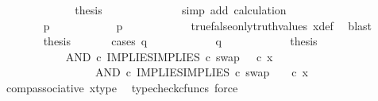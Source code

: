 \begin{isabellebody}
\ \ \ \ \ \ \ \ \ \ \isamarkupfalse%
\ \isamarkupfalse%
\ {\isacharquery}{\kern0pt}thesis\isanewline
\ \ \ \ \ \ \ \ \ \ \ \ \isamarkupfalse%
\ {\isacharparenleft}{\kern0pt}simp\ add{\isacharcolon}{\kern0pt}\ calculation{\isacharparenright}{\kern0pt}\isanewline
\ \ \ \ \ \ \ \ \isamarkupfalse%
\isanewline
\ \ \ \ \ \ \isamarkupfalse%
\isanewline
\ \ \ \ \isamarkupfalse%
\isanewline
\ \ \ \ \ \ \isamarkupfalse%
\ {\isachardoublequoteopen}p\ {\isasymnoteq}\ {\isasymt}{\isachardoublequoteclose}\isanewline
\ \ \ \ \ \ \isamarkupfalse%
\ \isamarkupfalse%
\ {\isachardoublequoteopen}p\ {\isacharequal}{\kern0pt}\ {\isasymf}{\isachardoublequoteclose}\isanewline
\ \ \ \ \ \ \ \ \isamarkupfalse%
\ true{\isacharunderscore}{\kern0pt}false{\isacharunderscore}{\kern0pt}only{\isacharunderscore}{\kern0pt}truth{\isacharunderscore}{\kern0pt}values\ x{\isacharunderscore}{\kern0pt}def\ \isamarkupfalse%
\ blast\isanewline
\ \ \ \ \ \ \isamarkupfalse%
\ {\isacharquery}{\kern0pt}thesis\isanewline
\ \ \ \ \ \ \isamarkupfalse%
{\isacharparenleft}{\kern0pt}cases\ {\isachardoublequoteopen}q\ {\isacharequal}{\kern0pt}\ {\isasymt}{\isachardoublequoteclose}{\isacharparenright}{\kern0pt}\isanewline
\ \ \ \ \ \ \ \ \isamarkupfalse%
\ {\isachardoublequoteopen}q\ {\isacharequal}{\kern0pt}\ {\isasymt}{\isachardoublequoteclose}\isanewline
\ \ \ \ \ \ \ \ \isamarkupfalse%
\ {\isacharquery}{\kern0pt}thesis\isanewline
\ \ \ \ \ \ \ \ \isamarkupfalse%
\ {\isacharminus}{\kern0pt}\ \isanewline
\ \ \ \ \ \ \ \ \ \ \isamarkupfalse%
\ {\isachardoublequoteopen}{\isacharparenleft}{\kern0pt}AND\ {\isasymcirc}\isactrlsub c\ {\isasymlangle}IMPLIES{\isacharcomma}{\kern0pt}IMPLIES\ {\isasymcirc}\isactrlsub c\ swap\ {\isasymOmega}\ {\isasymOmega}{\isasymrangle}{\isacharparenright}{\kern0pt}\ {\isasymcirc}\isactrlsub c\ x\ {\isacharequal}{\kern0pt}\ \ \ \ \isanewline
\ \ \ \ \ \ \ \ \ \ \ \ \ \ \ \ \ AND\ {\isasymcirc}\isactrlsub c\ {\isasymlangle}IMPLIES{\isacharcomma}{\kern0pt}IMPLIES\ {\isasymcirc}\isactrlsub c\ swap\ {\isasymOmega}\ {\isasymOmega}{\isasymrangle}\ \ {\isasymcirc}\isactrlsub c\ x{\isachardoublequoteclose}\isanewline
\ \ \ \ \ \ \ \ \ \ \ \ \isamarkupfalse%
\ comp{\isacharunderscore}{\kern0pt}associative{}\ x{\isacharunderscore}{\kern0pt}type\ \isamarkupfalse%
\ {\isacharparenleft}{\kern0pt}typecheck{\isacharunderscore}{\kern0pt}cfuncs{\isacharcomma}{\kern0pt}\ force{\isacharparenright}{\kern0pt}\isanewline

\end{isabellebody}

